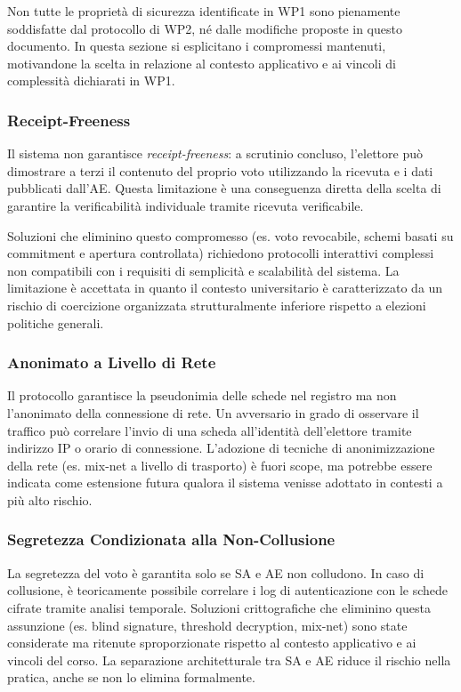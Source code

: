 \documentclass[12pt,a4paper]{article}
\begin{document}
Non tutte le proprietà di sicurezza identificate in WP1 sono pienamente soddisfatte dal protocollo di WP2, né dalle modifiche proposte in questo documento. In questa sezione si esplicitano i compromessi mantenuti, motivandone la scelta in relazione al contesto applicativo e ai vincoli di complessità dichiarati in WP1.

\subsubsection{Receipt-Freeness}
Il sistema non garantisce \textit{receipt-freeness}: a scrutinio concluso, l'elettore può dimostrare a terzi il contenuto del proprio voto utilizzando la ricevuta e i dati pubblicati dall'AE. Questa limitazione è una conseguenza diretta della scelta di garantire la verificabilità individuale tramite ricevuta verificabile.

Soluzioni che eliminino questo compromesso (es. voto revocabile, schemi basati su commitment e apertura controllata) richiedono protocolli interattivi complessi non compatibili con i requisiti di semplicità e scalabilità del sistema. La limitazione è accettata in quanto il contesto universitario è caratterizzato da un rischio di coercizione organizzata strutturalmente inferiore rispetto a elezioni politiche generali.

\subsubsection{Anonimato a Livello di Rete}
Il protocollo garantisce la pseudonimia delle schede nel registro ma non l'anonimato della connessione di rete. Un avversario in grado di osservare il traffico può correlare l'invio di una scheda all'identità dell'elettore tramite indirizzo IP o orario di connessione. L'adozione di tecniche di anonimizzazione della rete (es. mix-net a livello di trasporto) è fuori scope, ma potrebbe essere indicata come estensione futura qualora il sistema venisse adottato in contesti a più alto rischio.

\subsubsection{Segretezza Condizionata alla Non-Collusione}
La segretezza del voto è garantita solo se SA e AE non colludono. In caso di collusione, è teoricamente possibile correlare i log di autenticazione con le schede cifrate tramite analisi temporale. Soluzioni crittografiche che eliminino questa assunzione (es. blind signature, threshold decryption, mix-net) sono state considerate ma ritenute sproporzionate rispetto al contesto applicativo e ai vincoli del corso. La separazione architetturale tra SA e AE riduce il rischio nella pratica, anche se non lo elimina formalmente.
\end{document}
